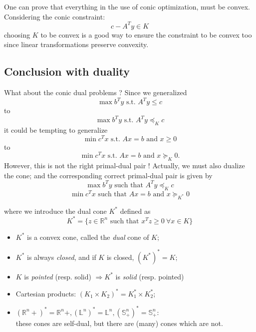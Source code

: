 One can prove that everything in the use of conic optimization, must be convex. Considering the conic constraint: 
\begin{equation}
c-A^Ty \in K \nonumber 
\end{equation}
choosing $K$ to be convex is a good way to ensure the constraint to be convex too since linear transformations preserve convexity. \\

\subsection{Conclusion with duality}
What about the conic dual problems ? Since we generalized
\[ \max b^T y \text{ s.t. } A^T y \leq c \] to
\[ \max b^T y \text{ s.t. } A^T y \preceq_K c \] it could be tempting to generalize
\[ \min c^T x \text{ s.t. } Ax = b \text{ and } x \geq 0 \]
to
\[ \min c^T x \text{ s.t. } Ax = b \text{ and } x \succeq_K 0 .\]
However, this is not the right primal-dual pair ! Actually, we must also dualize the cone; and the corresponding correct primal-dual pair is given by 
\vspace{0.3cm} \[ \max b^T y \text{ such that } A^T y \preceq_K c \]
\[ \min c^T x \text{ such that } Ax = b \text{ and } x \succeq_{K^*} 0 \]

\vspace{0.3cm}
where we introduce the dual cone $K^*$ defined as 
\[ K^* = \{ z \in \mathbb{R}^n \text{ such that }
x^T z \geq 0 \ \forall x \in K \} \]

\begin{itemize}
\item $K^*$ is a convex cone, called the \emph{dual} cone of $K$;
\item $K^*$ is always \emph{closed}, and if $K$ is closed, $(K^*)^* = K$; \item $K$ is \emph{pointed} (resp. 
   solid) $\Rightarrow K^*$ is \emph{solid} (resp. pointed) \item Cartesian products: $(K_1 \times K_2)^*
   = K_1^* \times K_2^*$;
\item $(\mathbb{R}^n+)^* = \mathbb{R}^n+, (\mathbb{L}^n)^* = \mathbb{L}^n, (\mathbb{S}_+^n)^* = \mathbb{S}_+^n$: \\these cones are self-dual, but there are (many) cones which are not.
\end{itemize}


% 
